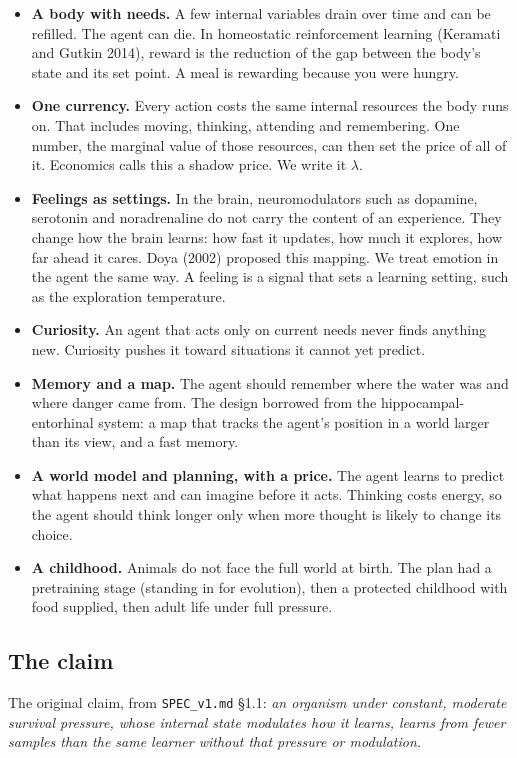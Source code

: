 \documentclass[11pt]{article}
\begin{document}
\begin{itemize}
\item \textbf{A body with needs.} A few internal variables drain over time and can be refilled. The agent can die. In homeostatic reinforcement learning (Keramati and Gutkin 2014), reward is the reduction of the gap between the body's state and its set point. A meal is rewarding because you were hungry.
\item \textbf{One currency.} Every action costs the same internal resources the body runs on. That includes moving, thinking, attending and remembering. One number, the marginal value of those resources, can then set the price of all of it. Economics calls this a shadow price. We write it $\lambda$.
\item \textbf{Feelings as settings.} In the brain, neuromodulators such as dopamine, serotonin and noradrenaline do not carry the content of an experience. They change how the brain learns: how fast it updates, how much it explores, how far ahead it cares. Doya (2002) proposed this mapping. We treat emotion in the agent the same way. A feeling is a signal that sets a learning setting, such as the exploration temperature.
\item \textbf{Curiosity.} An agent that acts only on current needs never finds anything new. Curiosity pushes it toward situations it cannot yet predict.
\item \textbf{Memory and a map.} The agent should remember where the water was and where danger came from. The design borrowed from the hippocampal-entorhinal system: a map that tracks the agent's position in a world larger than its view, and a fast memory.
\item \textbf{A world model and planning, with a price.} The agent learns to predict what happens next and can imagine before it acts. Thinking costs energy, so the agent should think longer only when more thought is likely to change its choice.
\item \textbf{A childhood.} Animals do not face the full world at birth. The plan had a pretraining stage (standing in for evolution), then a protected childhood with food supplied, then adult life under full pressure.
\end{itemize}

\subsection{The claim}

The original claim, from \texttt{SPEC\_v1.md} §1.1: \textit{an organism under constant, moderate survival pressure, whose internal state modulates how it learns, learns from fewer samples than the same learner without that pressure or modulation.}
\end{document}
